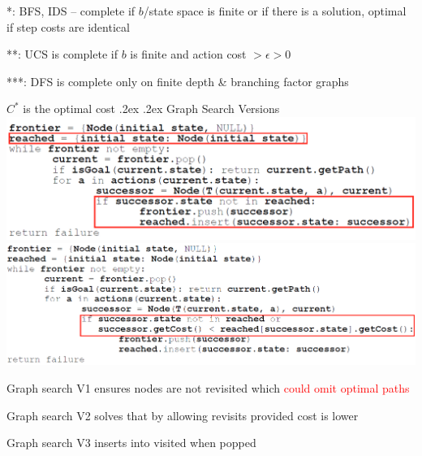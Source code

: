 \documentclass[10pt,landscape,a4paper]{article}
\makeatletter
\renewcommand{\section}{\@startsection{section}{1}{0mm}%
	{.2ex}%
	{.2ex}%
	{\color{myblue}\sffamily\small\bfseries}}
\makeatother
\begin{document}
\begin{multicols*}{4}
		*: BFS, IDS -- complete if $b$/state space is finite or if there is a solution, optimal if step costs are identical
		
		**: UCS is complete if $b$ is finite and action cost $> \epsilon > 0$
		
		***: DFS is complete only on finite depth \& branching factor graphs
		
		$C^*$ is the optimal cost
	\section{Graph Search Versions}
		\includegraphics[width=0.8\linewidth]{graph_v1}
		\includegraphics[width=0.8\linewidth]{graph_v2}
		
		Graph search V1 ensures nodes are not revisited which \textcolor{red}{could omit optimal paths}
		
		Graph search V2 solves that by allowing revisits provided cost is lower
		
		Graph search V3 inserts into visited when popped
	\columnbreak

\end{multicols*}
\end{document}
